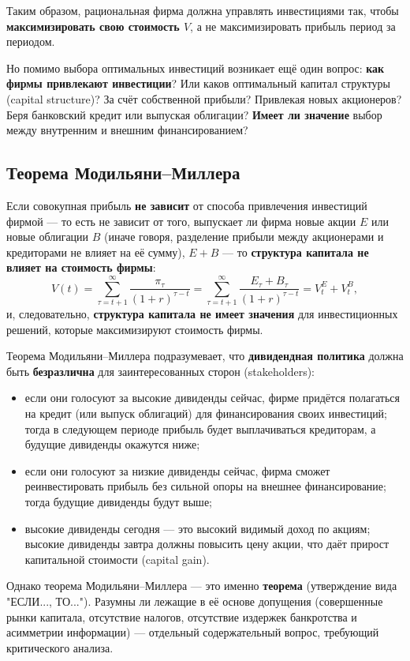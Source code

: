 \documentclass[10pt,a4paper]{article}
\begin{document}
Таким образом, рациональная фирма должна управлять инвестициями так, чтобы \textbf{максимизировать свою стоимость $V$}, а не максимизировать прибыль период за периодом.

Но помимо выбора оптимальных инвестиций возникает ещё один вопрос: \textbf{как фирмы привлекают инвестиции}? Или каков оптимальный капитал структуры (capital structure)? За счёт собственной прибыли? Привлекая новых акционеров? Беря банковский кредит или выпуская облигации? \textbf{Имеет ли значение} выбор между внутренним и внешним финансированием?

\subsection{Теорема Модильяни--Миллера}

Если совокупная прибыль \textbf{не зависит} от способа привлечения инвестиций фирмой — то есть не зависит от того, выпускает ли фирма новые акции $E$ или новые облигации $B$ (иначе говоря, разделение прибыли между акционерами и кредиторами не влияет на её сумму), $E+B$ — то \textbf{структура капитала не влияет на стоимость фирмы}:
$$V(t) = \sum_{\tau=t+1}^{\infty}\frac{\pi_\tau}{(1+r)^{\tau-t}} = \sum_{\tau=t+1}^{\infty}\frac{E_\tau+B_\tau}{(1+r)^{\tau-t}} = V_t^{E} + V_t^{B},$$
и, следовательно, \textbf{структура капитала не имеет значения} для инвестиционных решений, которые максимизируют стоимость фирмы.

\begin{intuition}
Теорема Модильяни--Миллера подразумевает, что \textbf{дивидендная политика} должна быть \textbf{безразлична} для заинтересованных сторон (stakeholders):
\begin{itemize}[leftmargin=1.3em]
\item если они голосуют за высокие дивиденды сейчас, фирме придётся полагаться на кредит (или выпуск облигаций) для финансирования своих инвестиций; тогда в следующем периоде прибыль будет выплачиваться кредиторам, а будущие дивиденды окажутся ниже;
\item если они голосуют за низкие дивиденды сейчас, фирма сможет реинвестировать прибыль без сильной опоры на внешнее финансирование; тогда будущие дивиденды будут выше;
\item высокие дивиденды сегодня — это высокий видимый доход по акциям; высокие дивиденды завтра должны повысить цену акции, что даёт прирост капитальной стоимости (capital gain).
\end{itemize}
Однако теорема Модильяни--Миллера — это именно \textbf{теорема} (утверждение вида "ЕСЛИ..., ТО..."). Разумны ли лежащие в её основе допущения (совершенные рынки капитала, отсутствие налогов, отсутствие издержек банкротства и асимметрии информации) — отдельный содержательный вопрос, требующий критического анализа.
\end{intuition}
\end{document}
